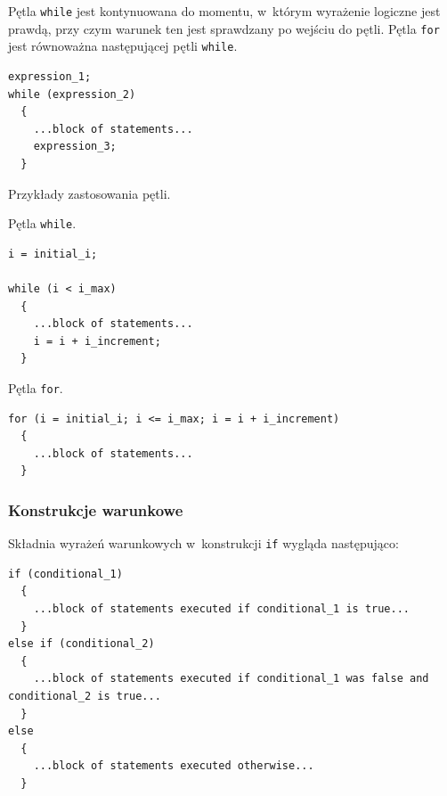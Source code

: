 Pętla \lstinline[style=MyCStyle]{while} jest kontynuowana do momentu, w~którym  wyrażenie logiczne jest prawdą, przy czym warunek ten jest sprawdzany po wejściu do pętli. Pętla \lstinline[style=MyCStyle]{for} jest równoważna następującej pętli \lstinline[style=MyCStyle]{while}.

\begin{lstlisting}[style=MyCStyle]
expression_1;
while (expression_2)
  {
    ...block of statements...
    expression_3;
  }
\end{lstlisting}

Przykłady zastosowania pętli.

\begin{myitemize}
\item Pętla \lstinline[style=MyCStyle]{while}.
\end{myitemize}

\begin{lstlisting}[style=MyCStyle]
i = initial_i;

while (i < i_max)
  {
    ...block of statements...
    i = i + i_increment;
  }
\end{lstlisting}

\begin{myitemize}
\item Pętla \lstinline[style=MyCStyle]{for}.
\end{myitemize}

\begin{lstlisting}[style=MyCStyle,caption=Pętla for - przykład]
for (i = initial_i; i <= i_max; i = i + i_increment)
  {
    ...block of statements...
  }
\end{lstlisting}


\subsubsection{Konstrukcje warunkowe}

Składnia wyrażeń warunkowych w~konstrukcji \lstinline[style=MyCStyle]{if} wygląda następująco: 

\begin{lstlisting}[style=MyCStyle]
if (conditional_1) 
  {
    ...block of statements executed if conditional_1 is true...
  }
else if (conditional_2)
  {
    ...block of statements executed if conditional_1 was false and conditional_2 is true...
  }
else
  {
    ...block of statements executed otherwise...
  }

\end{lstlisting}

